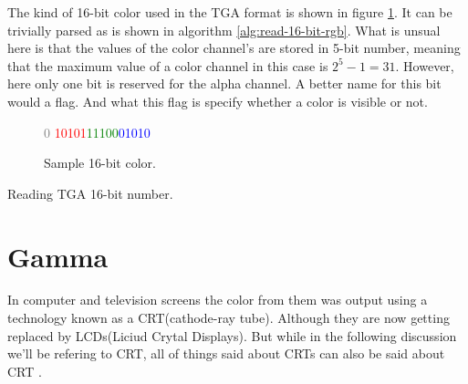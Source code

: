 The kind of 16-bit color used in the TGA format is shown in figure
\ref{fig:tga-16-bit-colors-bits}. It can be trivially parsed as is
shown in algorithm \ref{alg:read-16-bit-rgb}. What is unsual here is
that the values of the color channel's are stored in 5-bit number,
meaning that the maximum value of a color channel in this case is
$2^5 - 1 = 31$. However, here only one bit is reserved for the alpha
channel. A better name for this bit would a flag. And what this flag
is specify whether a color is visible or not.

\begin{figure}
  \centering
  {\huge\textcolor{gray}{0}%
    \textcolor{red}{10101}\textcolor{green}{11100}\textcolor{blue}{01010}}
  \caption{Sample 16-bit color.}
  \label{fig:tga-16-bit-colors-bits}
\end{figure}


\begin{algorithm}[H]
  \caption{Reading TGA 16-bit number.}
  \label{alg:read-16-bit-rgb}
  \begin{algorithmic}[1]
  \end{algorithmic}
\end{algorithm}

\section{Gamma}

\cite{roelofs99:_png}
\cite{boutel:_png_portab_networ_graph_specif_version11}
\cite{boutel:_png_portab_networ_graph_specif_version1}
\cite{boutel:_png_portab_networ_graph_specif_version12}
\cite{Pascale2003_ReviewRGBColourSpaces}
\cite{srgb}

\cite{lilley:_not_just_decor}

\cite{motta1991analytical_crt}

\cite{poynton2003digital}

In computer and television screens the color from them was output
using a technology known as a CRT(cathode-ray tube). Although they are
now getting replaced by LCDs(Liciud Crytal Displays). But while in the
following discussion we'll be refering to CRT, all of things said
about CRTs can also be said about CRT
\cite{hearn1997computer_graphics,roelofs99:_png}.

